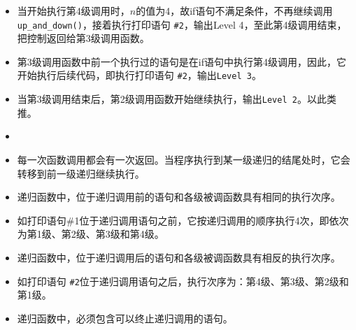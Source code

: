 \begin{frame}[fragile]
\begin{itemize}
\item 当开始执行第4级调用时，$n$的值为4，故if语句不满足条件，不再继续调用\lstinline|up_and_down()|，接着执行打印语句 \lstinline|#2|，输出{\tf Level 4}，至此第4级调用结束，把控制返回给第3级调用函数。\\[0.1in]
\item 第3级调用函数中前一个执行过的语句是在if语句中执行第4级调用，因此，它开始执行后续代码，即执行打印语句 \lstinline|#2|，输出\lstinline|Level 3|。\\[0.1in]
\item 当第3级调用结束后，第2级调用函数开始继续执行，输出\lstinline|Level 2|。以此类推。
\end{itemize}
\end{frame}

\begin{frame}[fragile]
\begin{itemize}
\item
{}\\[0.1in]
\item
每一次函数调用都会有一次返回。当程序执行到某一级递归的结尾处时，它会转移到前一级递归继续执行。
\end{itemize}
\end{frame}

\begin{frame}[fragile]
\begin{itemize}
\item
递归函数中，位于递归调用前的语句和各级被调函数具有相同的执行次序。\\[0.1in]
\item[] 如打印语句\#1位于递归调用语句之前，它按递归调用的顺序执行4次，即依次为第1级、第2级、第3级和第4级。\\[0.1in]
\item 
递归函数中，位于递归调用后的语句和各级被调函数具有相反的执行次序。\\[0.1in]
\item[] 
如打印语句 \lstinline|#2|位于递归调用语句之后，执行次序为：第4级、第3级、第2级和第1级。
\end{itemize}
\end{frame}

\begin{frame}[fragile]
\begin{itemize}
\item 递归函数中，必须包含可以终止递归调用的语句。
\end{itemize}

\end{frame}

